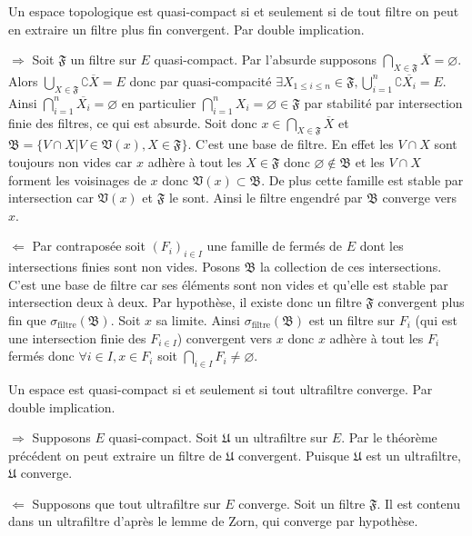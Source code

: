 \documentclass[a4paper, 11pt, french]{book}
\newenvironment{itemise}{\itemize}{\enditemize}
\theoremstyle{plain} %
\theoremstyle{definition} %
\theoremstyle{remark} %
\newcommand{\1}{\mathds{1}}
\newcommand\vide{\varnothing}
\newcommand{\infegal}{\leqslant}
\begin{document}
\proposition
Un espace topologique est quasi-compact si et seulement si de tout filtre on peut en extraire un filtre plus fin convergent.
\demonstration
Par double implication.
\begin{itemise}
	\item[$\Rightarrow$] Soit $\mathfrak{F}$ un filtre sur $E$ quasi-compact.
	Par l'absurde supposons $\bigcap_{X\in\mathfrak{F}}\overline{X}=\vide$.
	Alors $\bigcup_{X\in\mathfrak{F}}\complement\overline{X}=E$ donc par quasi-compacité $\exists X_{1\infegal i\infegal n}\in\mathfrak{F}, \bigcup_{i=1}^n\complement\overline{X_i}=E$.
	Ainsi $\bigcap_{i=1}^n\overline{X_i}=\vide$ en particulier $\bigcap_{i=1}^nX_i=\vide\in\mathfrak{F}$ par stabilité par intersection finie des filtres, ce qui est absurde.
	Soit donc $x\in\bigcap_{X\in\mathfrak{F}}\overline{X}$ et $\mathfrak{B}=\{V\cap X | V\in\mathfrak{V}(x), X\in\mathfrak{F}\}$.
	C'est une base de filtre.
	En effet les $V\cap X$ sont toujours non vides car $x$ adhère à tout les $X\in\mathfrak{F}$ donc $\vide\notin\mathfrak{B}$ et les $V\cap X$ forment les voisinages de $x$ donc $\mathfrak{V}(x)\subset\mathfrak{B}$.
	De plus cette famille est stable par intersection car $\mathfrak{V}(x)$ et $\mathfrak{F}$ le sont.
	Ainsi le filtre engendré par $\mathfrak{B}$ converge vers $x$.
	\item[$\Leftarrow$] Par contraposée soit $(F_i)_{i\in I}$ une famille de fermés de $E$ dont les intersections finies sont non vides.
	Posons $\mathfrak{B}$ la collection de ces intersections.
	C'est une base de filtre car ses éléments sont non vides et qu'elle est stable par intersection deux à deux.
	Par hypothèse, il existe donc un filtre $\mathfrak{F}$ convergent plus fin que $\sigma_\text{filtre}(\mathfrak{B})$.
	Soit $x$ sa limite.
	Ainsi $\sigma_\text{filtre}(\mathfrak{B})$ est un filtre sur $F_i$ (qui est une intersection finie des $F_{i\in I}$) convergent vers $x$ donc $x$ adhère à tout les $F_i$ fermés donc $\forall i\in I, x\in F_i$ soit $\bigcap_{i\in I}F_i\neq\vide$.
\end{itemise}

\proposition
Un espace est quasi-compact si et seulement si tout ultrafiltre converge.
\demonstration
Par double implication.
\begin{itemise}
	\item[$\Rightarrow$] Supposons $E$ quasi-compact.
	Soit $\mathfrak{U}$ un ultrafiltre sur $E$.
	Par le théorème précédent on peut extraire un filtre de $\mathfrak{U}$ convergent.
	Puisque $\mathfrak{U}$ est un ultrafiltre, $\mathfrak{U}$ converge.
	\item[$\Leftarrow$] Supposons que tout ultrafiltre sur $E$ converge.
	Soit un filtre $\mathfrak{F}$.
	Il est contenu dans un ultrafiltre d'après le lemme de Zorn, qui converge par hypothèse.
\end{itemise}
\end{document}
